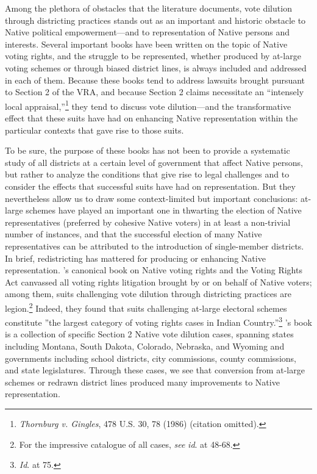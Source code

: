 \documentclass[12pt]{article}
\begin{document}
Among the plethora of obstacles that the literature documents, vote dilution through districting practices stands out as an important and historic obstacle to Native political empowerment—and to representation of Native persons and interests. Several important books have been written on the topic of Native voting rights, and the struggle to be represented, whether produced by at-large voting schemes or through biased district lines, is always included and addressed in each of them. Because these books tend to address lawsuits brought pursuant to Section 2 of the VRA, and because Section 2 claims necessitate an ``intensely local appraisal,''\footnote{\textit{Thornburg v. Gingles}, 478 U.S. 30, 78 (1986) (citation omitted).} they tend to discuss vote dilution—and the transformative effect that these suits have had on enhancing Native representation within the particular contexts that gave rise to those suits.

To be sure, the purpose of these books has not been to provide a systematic study of all districts at a certain level of government that affect Native persons, but rather to analyze the conditions that give rise to legal challenges and to consider the effects that successful suits have had on representation. But they nevertheless allow us to draw some context-limited but important conclusions: at-large schemes have played an important one in thwarting the election of Native representatives (preferred by cohesive Native voters) in at least a non-trivial number of instances, and that the successful election of many Native representatives can be attributed to the introduction of single-member districts. In brief, redistricting has mattered for producing or enhancing Native representation. \cite{mccool2007native}'s canonical book on Native voting rights and the Voting Rights Act canvassed all voting rights litigation brought by or on behalf of Native voters; among them, suits challenging vote dilution through districting practices are legion.\footnote{For the impressive catalogue of all cases, \textit{see} \textit{id}. at 48-68.} Indeed, they found that suits challenging at-large electoral schemes constitute ''the largest category of voting rights cases in Indian Country.''\footnote{\textit{Id}. at 75.} \cite{mcdonald2010american}'s book is a collection of specific Section 2 Native vote dilution cases, spanning states including Montana, South Dakota, Colorado, Nebraska, and Wyoming and governments including school districts, city commissions, county commissions, and state legislatures. Through these cases, we see that conversion from at-large schemes or redrawn district lines produced many improvements to Native representation.
\end{document}
